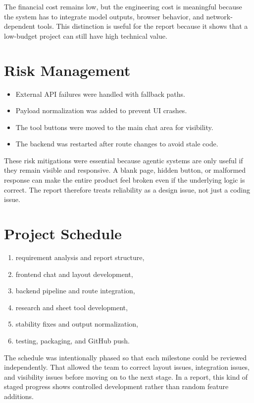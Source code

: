 \documentclass[11pt,oneside]{report}
\begin{document}
The financial cost remains low, but the engineering cost is meaningful because the system has to integrate model outputs, browser behavior, and network-dependent tools. This distinction is useful for the report because it shows that a low-budget project can still have high technical value.

\section{Risk Management}
\begin{itemize}[leftmargin=1.2cm]
  \item External API failures were handled with fallback paths.
  \item Payload normalization was added to prevent UI crashes.
  \item The tool buttons were moved to the main chat area for visibility.
  \item The backend was restarted after route changes to avoid stale code.
\end{itemize}

These risk mitigations were essential because agentic systems are only useful if they remain visible and responsive. A blank page, hidden button, or malformed response can make the entire product feel broken even if the underlying logic is correct. The report therefore treats reliability as a design issue, not just a coding issue.

\section{Project Schedule}
\begin{enumerate}[leftmargin=1.2cm]
  \item requirement analysis and report structure,
  \item frontend chat and layout development,
  \item backend pipeline and route integration,
  \item research and sheet tool development,
  \item stability fixes and output normalization,
  \item testing, packaging, and GitHub push.
\end{enumerate}

The schedule was intentionally phased so that each milestone could be reviewed independently. That allowed the team to correct layout issues, integration issues, and visibility issues before moving on to the next stage. In a report, this kind of staged progress shows controlled development rather than random feature additions.
\end{document}
